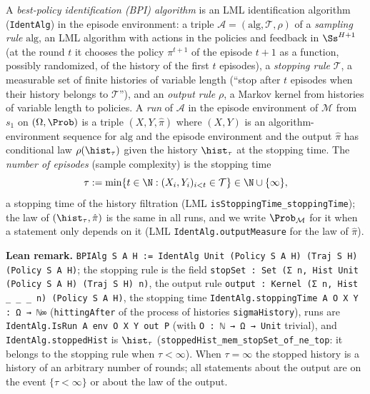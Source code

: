 \begin{definition}\label{def:bpi_alg}
\leanok
{}
A \emph{best-policy identification (BPI) algorithm} is an LML identification algorithm
(\texttt{IdentAlg}) in the episode environment: a triple $\mathcal A = (\mathrm{alg}, \mathcal T, \rho)$
of a \emph{sampling rule} $\mathrm{alg}$, an LML algorithm with actions in the policies and
feedback in $\Ss^{H+1}$ (at the round $t$ it chooses the policy $\pi^{t+1}$ of the episode
$t + 1$ as a function, possibly randomized, of the history of the first $t$ episodes), a
\emph{stopping rule} $\mathcal T$, a measurable set of finite histories of variable length
(``stop after $t$ episodes when their history belongs to $\mathcal T$''), and an \emph{output
rule} $\rho$, a Markov kernel from histories of variable length to policies. A \emph{run} of
$\mathcal A$ in the episode environment of $\mathcal M$ from $s_1$ on $(\Omega, \Prob)$ is a triple
$(X, Y, \hat\pi)$ where $(X, Y)$ is an algorithm-environment sequence for $\mathrm{alg}$ and the
episode environment and the output $\hat\pi$ has conditional law $\rho(\hist_\tau)$ given the
history $\hist_\tau$ at the stopping time. The \emph{number of episodes} (sample complexity) is
the stopping time
\[
  \tau := \min\{t \in \N : (X_i, Y_i)_{i < t} \in \mathcal T\} \in \N \cup \{\infty\} ,
\]
a stopping time of the history filtration (LML \texttt{isStoppingTime\_stoppingTime}); the law of
$(\hist_\tau, \hat\pi)$ is the same in all runs, and we write $\Prob_{\mathcal M}$ for it when a
statement only depends on it (LML \texttt{IdentAlg.outputMeasure} for the law of $\hat\pi$).
\end{definition}

\textbf{Lean remark.} \texttt{BPIAlg S A H := IdentAlg Unit (Policy S A H) (Traj S H) (Policy S A H)};
the stopping rule is the field \texttt{stopSet : Set (Σ n, Hist Unit (Policy S A H) (Traj S H) n)},
the output rule \texttt{output : Kernel (Σ n, Hist \_ \_ \_ n) (Policy S A H)}, the stopping time
\texttt{IdentAlg.stoppingTime A O X Y : Ω → ℕ∞} (\texttt{hittingAfter} of the process of
histories \texttt{sigmaHistory}), runs are \texttt{IdentAlg.IsRun A env O X Y out P} (with
\texttt{O : ℕ → Ω → Unit} trivial), and \texttt{IdentAlg.stoppedHist} is $\hist_\tau$
(\texttt{stoppedHist\_mem\_stopSet\_of\_ne\_top}: it belongs to the stopping rule when
$\tau < \infty$). When $\tau = \infty$ the stopped history is a history of an arbitrary
number of rounds; all statements about the output are on the event $\{\tau < \infty\}$ or
about the law of the output.

